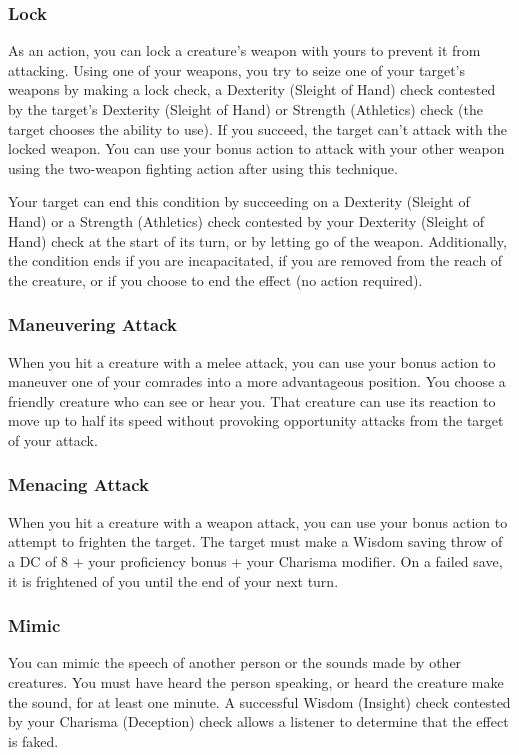 \subsubsection{Lock} \label{tec::lock}
As an action, you can lock a creature's weapon with yours to prevent it from attacking.
Using one of your weapons, you try to seize one of your target's weapons by making a lock check, a Dexterity (Sleight of Hand) check contested by the target's Dexterity (Sleight of Hand) or Strength (Athletics) check (the target chooses the ability to use).
If you succeed, the target can't attack with the locked weapon.
You can use your bonus action to attack with your other weapon using the two-weapon fighting action after using this technique.

Your target can end this condition by succeeding on a Dexterity (Sleight of Hand) or a Strength (Athletics) check contested by your Dexterity (Sleight of Hand) check at the start of its turn, or by letting go of the weapon.
Additionally, the condition ends if you are incapacitated, if you are removed from the reach of the creature, or if you choose to end the effect (no action required).

\subsubsection{Maneuvering Attack} \label{tec::maneuveringattack}
When you hit a creature with a melee attack, you can use your bonus action to maneuver one of your comrades into a more advantageous position.
You choose a friendly creature who can see or hear you.
That creature can use its reaction to move up to half its speed without provoking opportunity attacks from the target of your attack.

\subsubsection{Menacing Attack} \label{tec::menacingattack}
When you hit a creature with a weapon attack, you can use your bonus action to attempt to frighten the target.
The target must make a Wisdom saving throw of a DC of 8 + your proficiency bonus + your Charisma modifier.
On a failed save, it is frightened of you until the end of your next turn.

\subsubsection{Mimic} \label{tec::mimic}
You can mimic the speech of another person or the sounds made by other creatures.
You must have heard the person speaking, or heard the creature make the sound, for at least one minute.
A successful Wisdom (Insight) check contested by your Charisma (Deception) check allows a listener to determine that the effect is faked.

